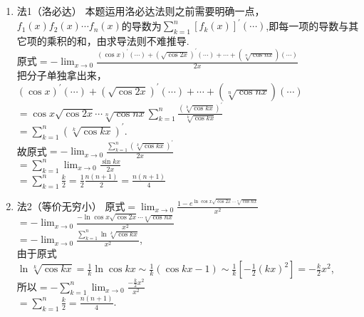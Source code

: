 \begin{solution}
	\begin{enumerate}
		\item 法1（洛必达）
		      本题运用洛必达法则之前需要明确一点，$f_1(x)f_2(x)\cdots f_n(x)$的导数为$\sum_{k=1}^{n}[f_k(x)]^{'}(\cdots)$,即每一项的导数与其它项的乘积的和，由求导法则不难推导.\\
		      原式$=-\lim_{x \to 0}\frac{(\cos x)^{'}(\cdots)+(\sqrt{\cos 2x})^{'}(\cdots)+\cdots+(\sqrt[n]{\cos nx})(\cdots)}{2x}$\\
		      把分子单独拿出来，\\$(\cos x)^{'}(\cdots)+(\sqrt{\cos 2x})^{'}(\cdots)+\cdots+(\sqrt[n]{\cos nx})(\cdots)$\\
		      $=\cos x \sqrt{\cos2x} \cdots \sqrt[n]{\cos nx}\sum_{k=1}^{n}\frac{(\sqrt[k]{\cos kx})^{'}}{\sqrt[k]{\cos kx}}$\\
		      $=\sum_{k=1}^{n}(\sqrt[k]{\cos kx})^{'}$.\\
			      故原式$=-\lim_{x \to 0}\frac{\sum_{k=1}^{n}(\sqrt[k]{\cos kx})^{'}}{2x}$\\
		      $=\sum_{k=1}^{n}\lim_{x \to 0}\frac{\sin kx}{2x}$\\
		      $=\sum_{k=1}^{n}\frac{k}{2}=\frac{1}{2}\frac{n(n+1)}{2}=\frac{n(n+1)}{4}$
		\item 法2（等价无穷小）
		      原式$=\lim_{x \to 0}\frac{1-e^{\ln \cos x \sqrt{\cos2x} \cdots \sqrt[n]{\cos nx}}}{x^2}$\\
		      $=-\lim_{x \to 0}\frac{-\ln \cos x \sqrt{\cos2x} \cdots \sqrt[n]{\cos nx}}{x^2}$\\
		      $=-\lim_{x \to 0}\frac{\sum_{k=1}^{n}\ln \sqrt[k]{\cos kx}}{x^2}$,\\
		      由于原式$\ln \sqrt[k]{\cos kx}=\frac{1}{k}\ln\cos kx\sim \frac{1}{k}(\cos kx-1)\sim \frac{1}{k}[-\frac{1}{2}(kx)^2]=-\frac{k}{2}x^2$,\\
		      所以$=-\sum_{k=1}^{n}\lim_{x \to 0}\frac{-\frac{k}{2}x^2}{x^2}$\\
		      $=\sum_{k=1}^{n}\frac{k}{2}=\frac{n(n+1)}{4}$.


\end{enumerate}
\end{solution}
